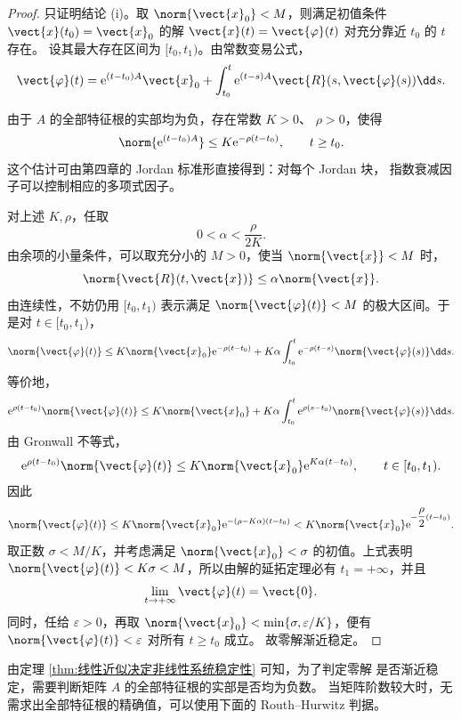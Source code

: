 \begin{proof}
	只证明结论 \textnormal{(i)}。取
	$\norm{\vect{x}_0}<M$，则满足初值条件
	$\vect{x}(t_0)=\vect{x}_0$ 的解
	$\vect{x}(t)=\vect{\varphi}(t)$ 对充分靠近 $t_0$ 的 $t$ 存在。
	设其最大存在区间为 $[t_0,t_1)$。由常数变易公式，
	\[
		\vect{\varphi}(t)
		=\mathrm{e}^{(t-t_0)A}\vect{x}_0
		+\int_{t_0}^t
		\mathrm{e}^{(t-s)A}
		\vect{R}(s,\vect{\varphi}(s))\dd s.
	\]

	由于 $A$ 的全部特征根的实部均为负，存在常数 $K>0$、
	$\rho>0$，使得
	\[
		\norm{\mathrm{e}^{(t-t_0)A}}
		\leq K\mathrm{e}^{-\rho(t-t_0)},
		\qquad t\geq t_0.
	\]
	这个估计可由第四章的 Jordan 标准形直接得到：对每个 Jordan 块，
	指数衰减因子可以控制相应的多项式因子。

	对上述 $K,\rho$，任取
	\[
		0<\alpha<\dfrac{\rho}{2K}.
	\]
	由余项的小量条件，可以取充分小的 $M>0$，使当
	$\norm{\vect{x}}<M$ 时，
	\[
		\norm{\vect{R}(t,\vect{x})}
		\leq\alpha\norm{\vect{x}}.
	\]
	由连续性，不妨仍用 $[t_0,t_1)$ 表示满足
	$\norm{\vect{\varphi}(t)}<M$ 的极大区间。于是对
	$t\in[t_0,t_1)$，
	\[
		\norm{\vect{\varphi}(t)}
		\leq K\norm{\vect{x}_0}\mathrm{e}^{-\rho(t-t_0)}
		+K\alpha\int_{t_0}^t
		\mathrm{e}^{-\rho(t-s)}
		\norm{\vect{\varphi}(s)}\dd s.
	\]
	等价地，
	\[
		\mathrm{e}^{\rho(t-t_0)}\norm{\vect{\varphi}(t)}
		\leq K\norm{\vect{x}_0}
		+K\alpha\int_{t_0}^t
		\mathrm{e}^{\rho(s-t_0)}
		\norm{\vect{\varphi}(s)}\dd s.
	\]
	由 Gronwall 不等式，
	\[
		\mathrm{e}^{\rho(t-t_0)}\norm{\vect{\varphi}(t)}
		\leq K\norm{\vect{x}_0}
		\mathrm{e}^{K\alpha(t-t_0)},
		\qquad t\in[t_0,t_1).
	\]
	因此
	\[
		\norm{\vect{\varphi}(t)}
		\leq K\norm{\vect{x}_0}
		\mathrm{e}^{-(\rho-K\alpha)(t-t_0)}
		<K\norm{\vect{x}_0}
		\mathrm{e}^{-\dfrac{\rho}{2}(t-t_0)}.
	\]
	取正数 $\sigma<M/K$，并考虑满足
	$\norm{\vect{x}_0}<\sigma$ 的初值。上式表明
	$\norm{\vect{\varphi}(t)}<K\sigma<M$，所以由解的延拓定理必有
	$t_1=+\infty$，并且
	\[
		\lim_{t\to+\infty}\vect{\varphi}(t)=\vect{0}.
	\]
	同时，任给 $\varepsilon>0$，再取
	$\norm{\vect{x}_0}<\min\{\sigma,\varepsilon/K\}$，便有
	$\norm{\vect{\varphi}(t)}<\varepsilon$ 对所有 $t\geq t_0$ 成立。
	故零解渐近稳定。
\end{proof}

由定理 \ref{thm:线性近似决定非线性系统稳定性} 可知，为了判定零解
是否渐近稳定，需要判断矩阵 $A$ 的全部特征根的实部是否均为负数。
当矩阵阶数较大时，无需求出全部特征根的精确值，可以使用下面的
Routh--Hurwitz 判据。

